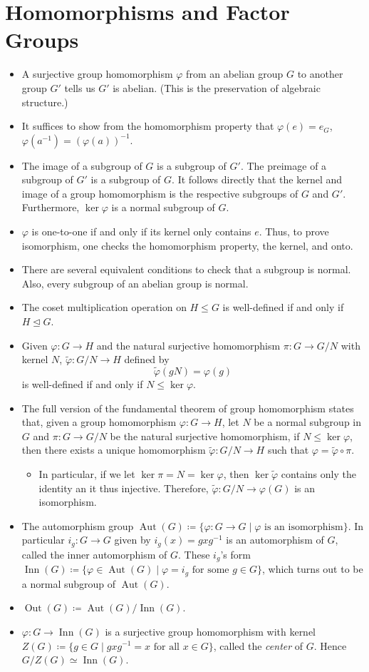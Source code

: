 \documentclass{article}
\newcommand{\aut}{\operatorname{Aut}}
\newcommand{\inn}{\operatorname{Inn}}
\renewcommand{\phi}{\varphi}
\begin{document}
\section{Homomorphisms and Factor Groups}
\begin{itemize}
    \item A surjective group homomorphism $\phi$ from an abelian group $G$ to another group $G'$ tells us $G'$ is abelian. (This is the preservation of algebraic structure.)
    \item It suffices to show from the homomorphism property that $\phi(e) = e_G$, $\phi(a^{-1}) = (\phi(a))^{-1}$.
    \item The image of a subgroup of $G$ is a subgroup of $G'$. The preimage of a subgroup of $G'$ is a subgroup of $G$. It follows directly that the kernel and image of a group homomorphism is the respective subgroups of $G$ and $G'$. Furthermore, $\ker \phi$ is a normal subgroup of $G$.
    \item $\phi$ is one-to-one if and only if its kernel only contains $e$. Thus, to prove isomorphism, one checks the homomorphism property, the kernel, and onto.
    \item There are several equivalent conditions to check that a subgroup is normal. Also, every subgroup of an abelian group is normal.
    \item The coset multiplication operation on $H \leq G$ is well-defined if and only if $H \trianglelefteq G$.
    \item Given $\phi: G \to H$ and the natural surjective homomorphism $\pi: G \to G/N$ with kernel $N$, $\tilde{\phi}: G/N \to H$ defined by $$\tilde{\phi}(gN) = \phi(g)$$ is well-defined if and only if $N \leq \ker \phi$.
    \item The full version of the fundamental theorem of group homomorphism states that, given a group homomorphism $\phi: G \to H$, let $N$ be a normal subgroup in $G$ and $\pi: G \to G/N$ be the natural surjective homomorphism, if $N \leq \ker \phi$, then there exists a unique homomorphism $\tilde{\phi}: G/N \to H$ such that $\phi = \tilde{\phi} \circ \pi$.
    \begin{itemize}
        \item In particular, if we let $\ker \pi = N = \ker \phi $, then $\ker \tilde{\phi}$ contains only the identity an it thus injective. Therefore, $\tilde{\phi}: G/N \to \phi(G)$ is an isomorphism.
    \end{itemize}
    \item The automorphism group $\aut(G) \coloneqq \{\phi: G \to G \mid \phi \text{ is an isomorphism}\}$. In particular $i_g: G \to G$ given by $i_g(x) = g x g^{-1}$ is an automorphism of $G$, called the inner automorphism of $G$. These $i_g$'s form $\inn(G) \coloneqq \{\phi \in \aut(G) \mid \phi = i_g \text{ for some } g \in G\}$, which turns out to be a normal subgroup of $\aut(G)$.
    \item $\operatorname{Out}(G) \coloneqq \aut(G)/\inn(G)$.
    \item $\phi: G \to \inn(G)$ is a surjective group homomorphism with kernel $Z(G) \coloneqq \{g \in G \mid g x g^{-1} = x \text{ for all } x \in G\}$, called the \textit{center} of $G$. Hence $G/Z(G) \simeq \inn(G)$.
\end{itemize}
\end{document}
